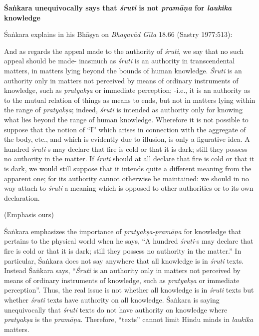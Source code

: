 {\bf Śaṅkara unequivocally says that {{\sl\bfseries śruti}\relax} is not {{\sl\bfseries pramāṇa}\relax} for {{\sl\bfseries laukika}\relax} knowledge}

Śaṅkara explains in his Bhāṣya on {\sl Bhagavād Gīta} 18.66 (Sastry 1977:513):
\begin{myquote}
And as regards the appeal made to the authority of {\sl śruti}, we say that no such appeal should be made- inasmuch as {\sl śruti} is an authority in transcendental matters, in matters lying beyond the bounds of human knowledge. {\sl Śruti} is an authority only in matters not perceived by means of ordinary instruments of knowledge, such as {\sl pratyakṣa} or immediate perception; -i.e., it is an authority as to the mutual relation of things as means to ends, but not in matters lying within the range of {\sl pratyakṣa}; indeed, {\sl śruti} is intended as authority only for knowing what lies beyond the range of human knowledge. Wherefore it is not possible to suppose that the notion of ``I'' which arises in connection with the aggregate of the body, etc., and which is evidently due to illusion, is only a figurative idea. A hundred {\sl śruti}-s may declare that fire is cold or that it is dark; still they possess no authority in the matter. If {\sl śruti} should at all declare that fire is cold or that it is dark, we would still suppose that it intends quite a different meaning from the apparent one; for its authority cannot otherwise be maintained: we should in no way attach to {\sl śruti} a meaning which is opposed to other authorities or to its own declaration.

\hfill (Emphasis ours)
\end{myquote}

Śaṅkara emphasizes the importance of {\sl pratyakṣa-pramāṇa} for knowledge that pertains to the physical world when he says, ``A hundred {\sl śruti}-s may declare that fire is cold or that it is dark; still they possess no authority in the matter.''  In particular, Śaṅkara does not say anywhere that all knowledge is in {\sl śruti} texts. Instead Śaṅkara says, ``{\sl Śruti} is an authority only in matters not perceived by means of ordinary instruments of knowledge, such as {\sl pratyakṣa} or immediate perception''. Thus, the real issue is not whether all knowledge is in {\sl śruti} texts but whether {\sl śruti} texts have authority on all knowledge.  Śaṅkara is saying unequivocally that {\sl śruti} texts do not have authority on knowledge where {\sl pratyakṣa} is the {\sl pramāṇa}. Therefore, ``texts'' cannot limit Hindu minds in {\sl laukika} matters.

